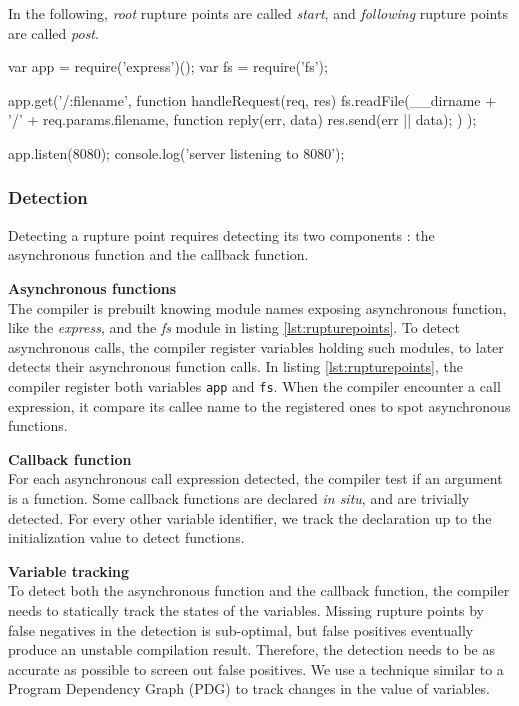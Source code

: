 In the following, \textit{root} rupture points are called \textit{start}, and \textit{following} rupture points are called \textit{post}.

\begin{code}[js, caption={Example of an application presenting the two types of rupture points : a \texttt{start} with the call to \texttt{app.get()}, and a \texttt{post} with the call to \texttt{fs.readFile()}},label={lst:rupturepoints}]
var app = require('express')();
var fs = require('fs');

app.get('/:filename', function handleRequest(req, res) {
  fs.readFile(__dirname + '/' + req.params.filename, function reply(err, data) {
    res.send(err || data);
  })
});

app.listen(8080);
console.log('server listening to 8080');
\end{code}

\subsubsection{Detection}

Detecting a rupture point requires detecting its two components : the asynchronous function and the callback function.

\textbf{Asynchronous functions}\\
The compiler is prebuilt knowing module names exposing asynchronous function, like the \textit{express}, and the \textit{fs} module in listing \ref{lst:rupturepoints}.
To detect asynchronous calls, the compiler register variables holding such modules, to later detects their asynchronous function calls.
In listing \ref{lst:rupturepoints}, the compiler register both variables \texttt{app} and \texttt{fs}.
When the compiler encounter a call expression, it compare its callee name to the registered ones to spot asynchronous functions.

\textbf{Callback function}\\
For each asynchronous call expression detected, the compiler test if an argument is a function.
Some callback functions are declared \textit{in situ}, and are trivially detected.
For every other variable identifier, we track the declaration up to the initialization value to detect functions.

\textbf{Variable tracking}\\
To detect both the asynchronous function and the callback function, the compiler needs to statically track the states of the variables.
Missing rupture points by false negatives in the detection is sub-optimal, but false positives eventually produce an unstable compilation result.
Therefore, the detection needs to be as accurate as possible to screen out false positives.
We use a technique similar to a Program Dependency Graph (PDG)\cite{Ferrante1987} to track changes in the value of variables.


